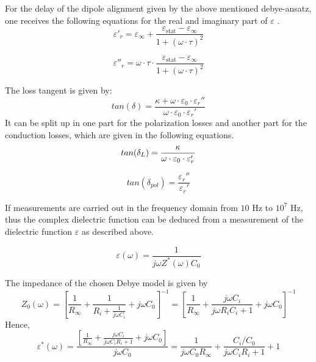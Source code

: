 For the delay of the dipole alignment given by the above mentioned debye-ansatz, one receives the following equations for the real and imaginary part of $\varepsilon$ \cite{Kuchler}. 
\begin{equation}
\varepsilon'_r = \varepsilon_{\infty} + \frac{\varepsilon_{\textrm{stat}}-\varepsilon_{\infty}}{1+(\omega \cdot \tau )^2}
\end{equation}

\begin{equation}
\varepsilon''_r = \omega \cdot \tau \cdot \frac{\varepsilon_{\textrm{stat}}-\varepsilon_{\infty}}{1+(\omega \cdot \tau )^2}
\end{equation}

The loss tangent is given by:
\begin{equation}
tan (\delta) = \frac{\kappa + \omega \cdot \varepsilon_0 \cdot \varepsilon _r ''}{\omega \cdot \varepsilon_0 \cdot \varepsilon _r '}
\end{equation}
It can be split up in one part for the polarization losses and another part for the conduction losses, which are given in the following equations. 
\begin{equation}
tan (\delta_{L}) = \frac{\kappa}{\omega \cdot \varepsilon_0 \cdot \varepsilon_r'} \newline
\end{equation}

\begin{equation}
tan (\delta_{pol}) = \frac {\varepsilon_r'' } {\varepsilon_r'}
\end{equation}


If measurements are carried out in the frequency domain from $10$ Hz to $10^{7}$ Hz, thus the complex dielectric function can be deduced from a measurement of the  dielectric function $\varepsilon$ as described above. 

\begin{equation}
\varepsilon(\omega) = \frac{1}{j \omega  Z^*(\omega) C_0}
\end{equation}

The impedance of the chosen Debye model is given by 
\begin{equation}
Z_0(\omega)=[\frac{1}{R_\infty}+\frac{1}{R_i+\frac{1}{j \omega C_i}}+j \omega C_0]^{-1} = [\frac{1}{R_\infty}+\frac{j \omega C_i}{j\omega R_i  C_i+1}+j \omega C_0]^{-1}
\end{equation}
Hence,
\begin{equation}
\varepsilon^*(\omega)= \frac{[\frac{1}{R_\infty}+\frac{j \omega C_i}{j\omega C_i R_i  +1}+j \omega C_0]}{j \omega C_0} = \frac{1}{j \omega C_0 R_\infty}+ \frac{C_i/C_0}{j\omega C_i R_i  +1}+1
\end{equation}

